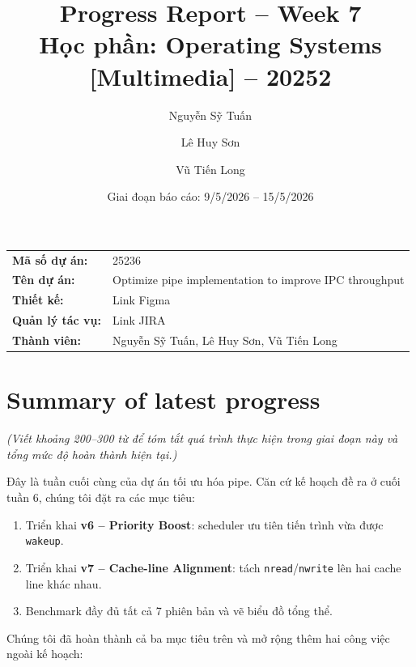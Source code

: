 \documentclass[11pt,a4paper]{article}
\title{\textbf{Progress Report -- Week 7}\\[3pt]
\large Học phần: Operating Systems [Multimedia] -- 20252}
\author{Nguyễn Sỹ Tuấn \and Lê Huy Sơn \and Vũ Tiến Long}
\date{Giai đoạn báo cáo: 9/5/2026 -- 15/5/2026}
\begin{document}
\maketitle

\begin{tabular}{@{}ll@{}}
\textbf{Mã số dự án:} & 25236 \\
\textbf{Tên dự án:}   & Optimize pipe implementation to improve IPC throughput \\
\textbf{Thiết kế:}    & Link Figma \\
\textbf{Quản lý tác vụ:} & Link JIRA \\
\textbf{Thành viên:}  & Nguyễn Sỹ Tuấn, Lê Huy Sơn, Vũ Tiến Long \\
\end{tabular}

\hrulefill

\section{Summary of latest progress}

\textit{(Viết khoảng 200--300 từ để tóm tắt quá trình thực hiện trong giai đoạn này và tổng mức độ hoàn thành hiện tại.)}

Đây là tuần cuối cùng của dự án tối ưu hóa pipe. Căn cứ kế hoạch đề ra ở cuối tuần 6, chúng tôi đặt ra các mục tiêu:

\begin{enumerate}
  \item Triển khai \textbf{v6 -- Priority Boost}: scheduler ưu tiên tiến trình vừa được \texttt{wakeup}.
  \item Triển khai \textbf{v7 -- Cache-line Alignment}: tách \texttt{nread}/\texttt{nwrite} lên hai cache line khác nhau.
  \item Benchmark đầy đủ tất cả 7 phiên bản và vẽ biểu đồ tổng thể.
\end{enumerate}

Chúng tôi đã hoàn thành cả ba mục tiêu trên và mở rộng thêm hai công việc ngoài kế hoạch:
\end{document}
